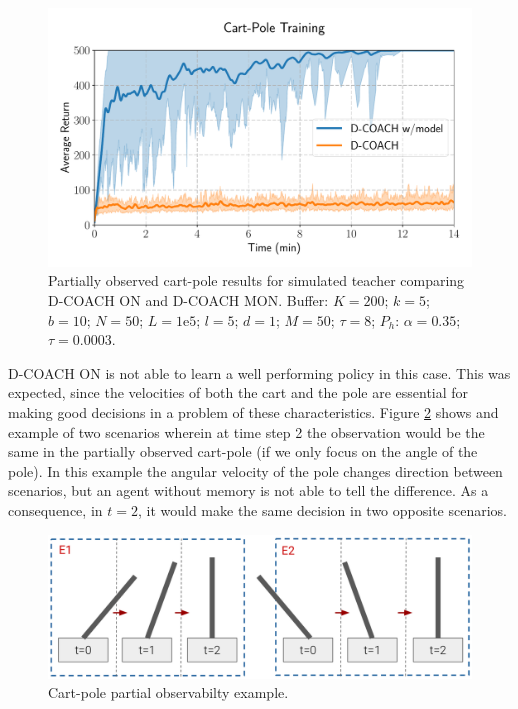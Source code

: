 \begin{figure}[h]
    \centering
    \includegraphics[width=0.9\linewidth]{imagenes/cap3/cartpole_LD_model.pdf}
    \caption{Partially observed cart-pole results for simulated teacher comparing D-COACH ON and D-COACH MON.  Buffer: $K = 200$; $k=5$; $b = 10$; $N = 50$; $L=1\mathrm{e}5$; $l=5$; $d=1$; $M=50$; $\tau=8$; $P_{h}$: $\alpha = 0.35$; $\tau = 0.0003$.}
    \label{fig:ld_cartpole_model}
\end{figure}

D-COACH ON is not able to learn a well performing policy in this case. This was expected, since the velocities of both the cart and the pole are essential for making good decisions in a problem of these characteristics. Figure \ref{fig:cp_ex} shows and example of two scenarios wherein at time step 2 the observation would be the same in the partially observed cart-pole (if we only focus on the angle of the pole). In this example the angular velocity of the pole changes direction between scenarios, but an agent without memory is not able to tell the difference. As a consequence, in $t=2$, it would make the same decision in two opposite scenarios.

\begin{figure}[h]
    \centering
    \includegraphics[width=0.9\linewidth]{imagenes/cap4/cartpole_ex.png}
    \caption{Cart-pole partial observabilty example.}
    \label{fig:cp_ex}
\end{figure}

